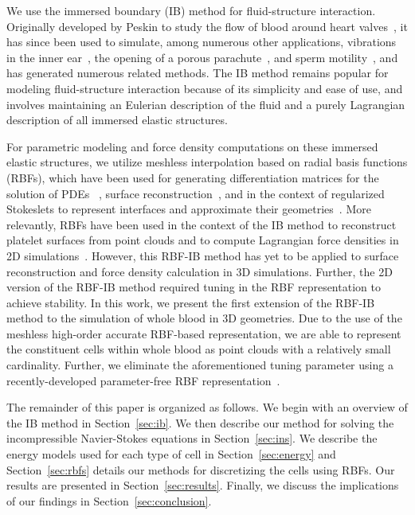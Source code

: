 We use the immersed boundary (IB) method for fluid-structure interaction. Originally
developed by Peskin to study the flow of blood around heart valves~\cite{Peskin:1972wa},
it has since been used to simulate, among numerous other applications, vibrations in the
inner ear~\cite{BeyerJr:1990tb}, the opening of a porous parachute~\cite{Kim:2006ku}, and
sperm motility~\cite{Dillon:2011cu}, and has generated numerous related methods. The IB
method remains popular for modeling fluid-structure interaction because of its simplicity
and ease of use, and involves maintaining an Eulerian description of the fluid and a
purely Lagrangian description of all immersed elastic structures.

For parametric modeling and force density computations on these immersed elastic
structures, we utilize meshless interpolation based on radial basis functions (RBFs),
which have been used for generating differentiation matrices for the solution of PDEs~%
\cite{Fasshauer:2007ui}, surface reconstruction~\cite{Hardy:1971tb,Carr:2001tb,
Shankar:2013ki, SFKSISC2018}, and in the context of regularized Stokeslets to represent
interfaces and approximate their geometries~\cite{Olson:2015ja}. More relevantly, RBFs
have been used in the context of the IB method to reconstruct platelet surfaces from
point clouds and to compute Lagrangian force densities in 2D
simulations~\cite{Shankar:2015km}. However, this RBF-IB method has yet to be applied to
surface reconstruction and force density calculation in 3D simulations. Further, the 2D
version of the RBF-IB method required tuning in the RBF representation to achieve
stability. In this work, we present the first extension of the RBF-IB method to the
simulation of whole blood in 3D geometries.  Due to the use of the meshless high-order
accurate RBF-based representation, we are able to represent the constituent cells within
whole blood as point clouds with a relatively small cardinality. Further, we eliminate
the aforementioned tuning parameter using a recently-developed parameter-free RBF
representation~\cite{SFKSISC2018}.

The remainder of this paper is organized as follows. We begin with an overview of the IB
method in Section~\ref{sec:ib}. We then describe our method for solving the
incompressible Navier-Stokes equations in Section~\ref{sec:ins}. We describe the energy
models used for each type of cell in Section~\ref{sec:energy} and Section~\ref{sec:rbfs}
details our methods for discretizing the cells using RBFs. Our results are presented in
Section~\ref{sec:results}. Finally, we discuss the implications of our findings in
Section~\ref{sec:conclusion}.

